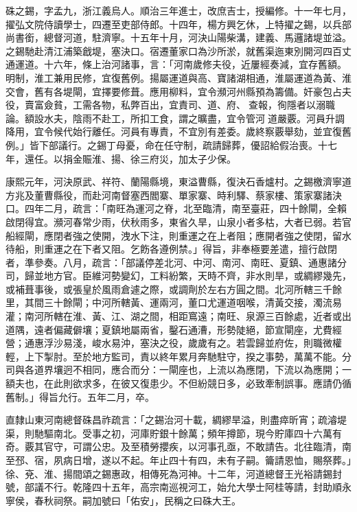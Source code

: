 \begin{pinyinscope}
硃之錫，字孟九，浙江義烏人。順治三年進士，改庶吉士，授編修。十一年七月，擢弘文院侍讀學士，四遷至吏部侍郎。十四年，楊方興乞休，上特擢之錫，以兵部尚書銜，總督河道，駐濟寧。十五年十月，河決山陽柴溝，建義、馬邏諸堤並溢。之錫馳赴清江浦築戧堤，塞決口。宿遷董家口為沙所淤，就舊渠迤東別開河四百丈通運道。十六年，條上治河諸事，言：「河南歲修夫役，近屢經奏減，宜存舊額。明制，淮工兼用民修，宜復舊例。揚屬運道與高、寶諸湖相通，淮屬運道為黃、淮交會，舊有各堤閘，宜擇要修葺。應用柳料，宜令瀕河州縣預為籌備。奸豪包占夫役，賣富僉貧，工需各物，私弊百出，宜責司、道、府、查報，徇隱者以溺職論。額設水夫，陰雨不赴工，所扣工食，謂之曠盡，宜令管河道嚴覈。河員升調降用，宜令候代始行離任。河員有專責，不宜別有差委。歲終察覈舉劾，並宜復舊例。」皆下部議行。之錫丁母憂，命在任守制，疏請歸葬，優詔給假治喪。十七年，還任。以捐金賑淮、揚、徐三府災，加太子少保。

康熙元年，河決原武、祥符、蘭陽縣境，東溢曹縣，復決石香爐村。之錫檄濟寧道方兆及董曹縣役，而赴河南督塞西閻寨、單家寨、時利驛、蔡家樓、策家寨諸決口。四年二月，疏言：「南旺為運河之脊，北至臨清，南至臺莊，四十餘閘，全賴啟閉得宜。瀕河春常少雨，伏秋雨多，東省久旱，山泉小者多枯，大者已弱。若官船經閘，應閉者強之使開，洩水下注，則重運之在上者阻；應開者強之使閉，留水待船，則重運之在下者又阻。乞飭各遵例禁。」得旨，非奉極要差遣，擅行啟閉者，準參奏。八月，疏言：「部議停差北河、中河、南河、南旺、夏鎮、通惠諸分司，歸並地方官。臣維河勢變幻，工料紛繁，天時不齊，非水則旱，或綢繆幾先，或補葺事後，或張皇於風雨倉遽之際，或調劑於左右方圓之間。北河所轄三千餘里，其間三十餘閘；中河所轄黃、運兩河，董口尤運道咽喉，清黃交接，濁流易灌；南河所轄在淮、黃、江、湖之間，相距窵遠；南旺、泉源三百餘處，近者或出道隅，遠者偏藏僻壤；夏鎮地屬兩省，鑿石通漕，形勢陡絕，節宣閘座，尤費經營；通惠浮沙易淺，峻水易沖，塞決之役，歲歲有之。若雲歸並府佐，則職微權輕，上下掣肘。至於地方監司，責以終年累月奔馳駐守，揆之事勢，萬萬不能。分司與各道界壤迥不相同，應合而分：一閘座也，上流以為應閉，下流以為應開；一額夫也，在此則欲求多，在彼又復患少。不但紛競日多，必致牽制誤事。應請仍循舊制。」得旨允行。五年二月，卒。

直隸山東河南總督硃昌祚疏言：「之錫治河十載，綢繆旱溢，則盡瘁昕宵；疏濬堤渠，則馳驅南北。受事之初，河庫貯銀十餘萬；頻年撙節，現今貯庫四十六萬有奇。覈其官守，可謂公忠。及至積勞攖疾，以河事孔亟，不敢請告。北往臨清，南至邳、宿，夙病日增，遂以不起。年止四十有四，未有子嗣。籥請恩恤，賜祭葬。」徐、兗、淮、揚間頌之錫惠政，相傳死為河神。十二年，河道總督王光裕請錫封號，部議不行。乾隆四十五年，高宗南巡視河工，始允大學士阿桂等請，封助順永寧侯，春秋祠祭。嗣加號曰「佑安」，民稱之曰硃大王。


\end{pinyinscope}
